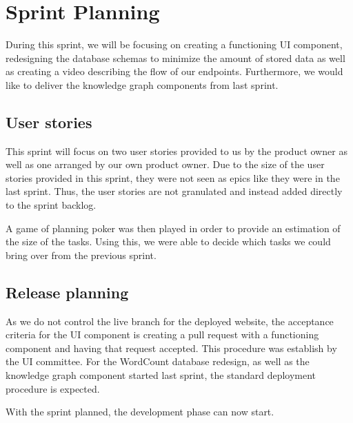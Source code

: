 \section{Sprint Planning}
During this sprint, we will be focusing on creating a functioning UI component, redesigning the database schemas to minimize the amount of stored data as well as creating a video describing the flow of our endpoints. Furthermore, we would like to deliver the knowledge graph components from last sprint. 

\subsection*{User stories}
This sprint will focus on two user stories provided to us by the \knox{} product owner as well as one arranged by our own product owner. 
Due to the size of the user stories provided in this sprint, they were not seen as epics like they were in the last sprint. Thus, the user stories are not granulated and instead added directly to the sprint backlog.  


A game of planning poker was then played in order to provide an estimation of the size of the tasks. 
Using this, we were able to decide which tasks we could bring over from the previous sprint.

\subsection*{Release planning}
As we do not control the live branch for the deployed \knox{} website, the acceptance criteria for the UI component is creating a pull request with a functioning component and having that request accepted.
This procedure was establish by the UI committee. 
For the WordCount database redesign, as well as the knowledge graph component started last sprint, the standard deployment procedure is expected. 

With the sprint planned, the development phase can now start.
